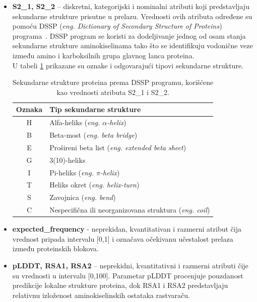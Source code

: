 \documentclass[a4paper,12pt]{article}
\begin{document}
\begin{itemize}
\begin{table}[h!]
	\caption{Aminokiseline i njihove jednoslovne oznake korišćene kao vrednosti atributa AA1 i AA2.}
	\label{Tabela:2}
\end{table}
\newpage
    \item \textbf{S2\_1, S2\_2} – diskretni, kategorijski i nominalni atributi koji predstavljaju sekundarne strukture prisutne u prelazu. Vrednosti ovih atributa određene su pomoću DSSP (\textit{eng. Dictionary of Secondary Structure of Proteins}) programa~\cite{carter2003dsspcont}. DSSP program se koristi za dodeljivanje jednog od osam stanja sekundarne strukture aminokiselinama tako što se identifikuju vodonične veze između amino i karboksilnih grupa glavnog lanca proteina. \\
U tabeli \ref{Tabela:3} prikazane su oznake i odgovarajući tipovi sekundarne strukture.
\\
\begin{table}[h!]
    \centering
    \begin{tabular}{ |c|l| } 
    \hline
    \textbf{Oznaka} & \textbf{Tip sekundarne strukture} \\
    \hline
    H & Alfa-heliks (\textit{eng. $\alpha$-helix}) \\
    B & Beta-most (\textit{eng. beta bridge}) \\
    E & Prošireni beta list (\textit{eng. extended beta sheet}) \\
    G & 3(10)-heliks \\
    I & Pi-heliks (\textit{eng. $\pi$-helix}) \\
    T & Heliks okret (\textit{eng. helix-turn}) \\
    S & Zavojnica (\textit{eng. bend}) \\
    C & Nespecifična ili neorganizovana struktura (\textit{eng. coil}) \\
    \hline
    \end{tabular}
    \caption{Sekundarne strukture proteina prema DSSP programu, korišćene kao vrednosti atributa S2\_1 i S2\_2.}
    \label{Tabela:3}
\end{table}
\newpage
    \item \textbf{expected\_frequency} - neprekidan, kvantitativan i razmerni atribut čija vrednost pripada intervalu [0,1] i označava očekivanu učestalost prelaza između proteinskih blokova.
    \item \textbf{pLDDT, RSA1, RSA2} – neprekidni, kvantitativni i razmerni atributi čije su vrednosti u intervalu [0,100]. Parametar pLDDT procenjuje pouzdanost predikcije lokalne strukture proteina, dok RSA1 i RSA2 predstavljaju relativnu izloženost aminokiselinskih ostataka rastvaraču.
\end{itemize}
\end{document}
